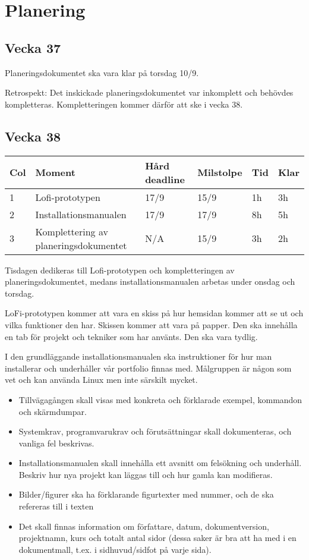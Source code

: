\documentclass{TDP003mall}
\begin{document}
\newpage

\section{Planering}
\subsection*{Vecka 37}
Planeringsdokumentet ska vara klar på torsdag 10/9.

Retrospekt: Det inskickade planeringsdokumentet var inkomplett och behövdes kompletteras. Kompletteringen kommer därför att ske i vecka 38.

\subsection*{Vecka 38}
\begin{table}[!h]
\begin{tabularx}{\linewidth}{|l|X|l|l|l|l|}
\hline
Col & Moment & Hård deadline & Milstolpe & Tid & Klar \\\hline
1 & Lofi-prototypen & 17/9 & 15/9 & 1h & 3h \\\hline
2 & Installationsmanualen & 17/9 & 17/9 & 8h & 5h \\\hline
3 & Komplettering av planeringsdokumentet & N/A & 15/9 & 3h & 2h\\\hline
\end{tabularx}
\end{table}

Tisdagen dedikeras till Lofi-prototypen och kompletteringen av planeringsdokumentet, medans installationsmanualen arbetas under onsdag och torsdag.

LoFi-prototypen kommer att vara en skiss på hur hemsidan kommer att se ut och vilka funktioner den har. Skissen kommer att vara på papper. Den ska innehålla en tab för projekt och tekniker som har använts. Den ska vara tydlig.

I den grundläggande installationsmanualen ska instruktioner för hur man installerar och underhåller vår portfolio finnas med. Målgruppen är någon som vet och kan använda Linux men inte särskilt mycket.

\begin{itemize}
\item
  Tillvägagången skall visas med konkreta och förklarade exempel, kommandon och skärmdumpar.
\item	
  Systemkrav, programvarukrav och förutsättningar skall dokumenteras, och vanliga fel beskrivas.
\item	
  Installationsmanualen skall innehålla ett avsnitt om felsökning och underhåll. Beskriv hur nya projekt kan läggas till och hur gamla kan modifieras.
\item	
  Bilder/figurer ska ha förklarande figurtexter med nummer, och de ska refereras till i texten
\item	
  Det skall finnas information om författare, datum, dokumentversion, projektnamn, kurs och totalt antal sidor (dessa saker är bra att ha med i en dokumentmall, t.ex. i sidhuvud/sidfot på varje sida). 
\end{itemize}
\end{document}
